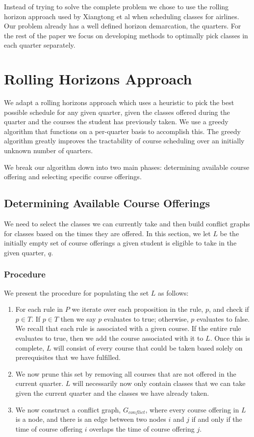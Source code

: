 \documentclass[11pt]{article} %
\begin{document}
Instead of trying to solve the complete problem we chose to use the rolling
horizon approach used by Xiangtong et al \cite{xiangton:informs} when scheduling
classes for airlines. Our problem already has a well defined horizon
demarcation, the quarters. For the rest of the paper we focus on developing
methods to optimally pick classes in each quarter separately.

\section{Rolling Horizons Approach} We adapt a rolling horizons approach which
uses a heuristic to pick the best possible schedule for any given quarter, given
the classes offered during the quarter and the courses the student has
previously taken. We use a greedy algorithm that functions on a per-quarter
basis to accomplish this. The greedy algorithm greatly improves the tractability
of course scheduling over an initially unknown number of quarters.

We break our algorithm down into two main phases: determining available course
offering and selecting specific course offerings.

\subsection{Determining Available Course Offerings} We need to select the
classes we can currently take and then build conflict graphs for classes based
on the times they are offered. In this section, we let $L$ be the initially
empty set of course offerings a given student is eligible to take in the given
quarter, $q$.

\subsubsection{Procedure} We present the procedure for populating the set $L$ as
follows: \begin{enumerate} \item For each rule in $P$ we iterate over each
proposition in the rule, $p$, and check if $p \in T$. If $p \in T$ then we say
$p$ evaluates to true; otherwise, $p$ evaluates to false. We recall that each
rule is associated with a given course. If the entire rule evaluates to true,
then we add the course associated with it to $L$. Once this is complete, $L$
will consist of every course that could be taken based solely on prerequisites
that we have fulfilled.  \item We now prune this set by removing all courses
that are not offered in the current quarter. $L$ will necessarily now only
contain classes that we can take given the current quarter and the classes we
have already taken.  \item We now construct a conflict graph, $G_{conflict}$,
where every course offering in $L$ is a node, and there is an edge between two
nodes $i$ and $j$ if and only if the time of course offering $i$ overlaps the
time of course offering $j$.  \end{enumerate}
\end{document}

